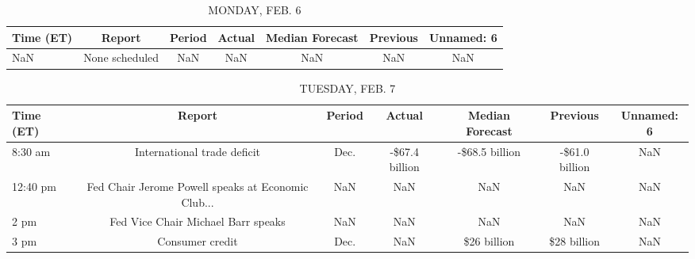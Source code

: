 \documentclass{article}%
\begin{document}
%
\normalsize%


\begin{table}[htbp]%
\caption{MONDAY, FEB. 6}%
\centering%
\begin{adjustbox}{width=1\textwidth}%
\begin{tabular}{lcccccc}
\toprule
Time (ET) &         Report & Period & Actual & Median Forecast & Previous & Unnamed: 6 \\
\midrule
      NaN & None scheduled &    NaN &    NaN &             NaN &      NaN &        NaN \\
\bottomrule
\end{tabular}
%
\end{adjustbox}%
\end{table}

%


\begin{table}[htbp]%
\caption{TUESDAY, FEB. 7}%
\centering%
\begin{adjustbox}{width=1\textwidth}%
\begin{tabular}{lcccccc}
\toprule
Time (ET) &                                             Report & Period &         Actual & Median Forecast &       Previous & Unnamed: 6 \\
\midrule
  8:30 am &                        International trade deficit &   Dec. & -\$67.4 billion &  -\$68.5 billion & -\$61.0 billion &        NaN \\
 12:40 pm & Fed Chair Jerome Powell speaks at Economic Club... &    NaN &            NaN &             NaN &            NaN &        NaN \\
     2 pm &                 Fed Vice Chair Michael Barr speaks &    NaN &            NaN &             NaN &            NaN &        NaN \\
     3 pm &                                    Consumer credit &   Dec. &            NaN &     \$26 billion &    \$28 billion &        NaN \\
\bottomrule
\end{tabular}
%
\end{adjustbox}%
\end{table}

%
\end{document}
